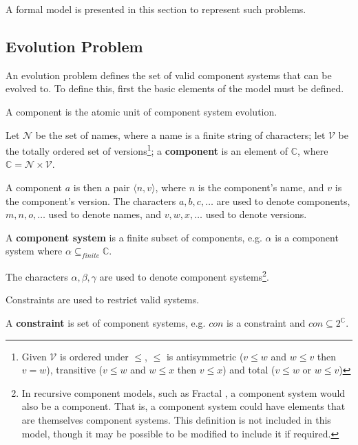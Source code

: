A formal model is presented in this section to represent such problems. 

\subsection{Evolution Problem}
An evolution problem defines the set of valid component systems that can be evolved to.
To define this, first the basic elements of the model must be defined.

A component is the atomic unit of component system evolution.
\begin{defs}
\label{formal.componentdef}
Let $\mathcal{N}$ be the set of names, where a name is a finite string of characters; 
let $\mathcal{V}$ be the totally ordered set of versions\footnote{Given $\mathcal{V}$ is ordered under 
$\leq$, $\leq$ is antisymmetric ($v \leq w$ and $w \leq v$ then $v = w$), transitive ($v \leq w$ and $w \leq x$ then $v \leq x$) and total ($v \leq w$ or $w \leq v$)}; 
a \textbf{component}
is an element of $\mathbb{C}$, where $\mathbb{C} = \mathcal{N} \times \mathcal{V}$.
\end{defs}
A component $a$ is then a pair $\langle n,v \rangle$, where $n$ is the component's name, and $v$ is the component's version.
The characters  $a,b,c,\ldots$ are used to denote components, $m,n,o,\ldots$ used to denote names, and $v,w,x,\ldots$ used to denote versions.

\begin{defs}
\label{formal.componentsystemdef}
A \textbf{component system} is a finite subset of components, e.g. $\alpha$ is a component system where $\alpha \subseteq_{finite} \mathbb{C}$. 
\end{defs}
The characters $\alpha,\beta,\gamma$ are used to denote component systems\footnote{In recursive component models, such as Fractal \citep{Quma2006}, 
a component system would also be a component.
That is, a component system could have elements that are themselves component systems.
This definition is not included in this model, though it may be possible to be modified to include it if required.}.

Constraints are used to restrict valid systems.
\begin{defs}
\label{formal.constraintdefs}
A \textbf{constraint} is set of component systems, e.g. $con$ is a constraint and $con \subseteq 2^{\mathbb{C}}$.
\end{defs}

